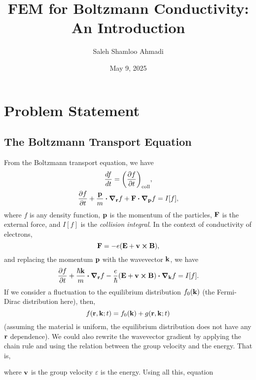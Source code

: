 \documentclass[12pt]{article}
\title{FEM for Boltzmann Conductivity: An Introduction}
\author{Saleh Shamloo Ahmadi}
\date{May 9, 2025}
\begin{document}
\maketitle
\section{Problem Statement}
\subsection{The Boltzmann Transport Equation}
From the Boltzmann transport equation, we have
\begin{gather}
    \dv{f}{t} = \qty(\pdv{f}{t})_{\text{coll}}, \\
    \pdv{f}{t} + \frac{\vb{p}}{m}\vdot\grad_{\vb{r}} f + \vb{F}\vdot\grad_{\vb{p}}f = I[f],
\end{gather}
where $f$ is any density function, $\vb{p}$ is the momentum of the particles, $\vb{F}$ is the
external force, and $I[f]$ is the \emph{collision integral}. In the context of conductivity of
electrons,
\begin{equation}
    \vb{F} = -e\qty(\vb{E} + \vb{v}\cross\vb{B}),
\end{equation}
and replacing the momentum $\vb{p}$ with the wavevector $\vb{k}$, we have
\begin{equation}
    \pdv{f}{t} + \frac{\hbar\vb{k}}{m}\vdot\grad_{\vb{r}} f
    - \frac{e}{\hbar}\qty(\vb{E} + \vb{v}\cross\vb{B})\vdot\grad_{\vb{k}}f = I[f].
    \label{eq:boltzmann_general}
\end{equation}
If we consider a fluctuation to the equilibrium distribution $f_0(\vb{k})$ (the Fermi-Dirac
distribution here), then,
\begin{equation}
    f(\vb{r}, \vb{k}; t) = f_0(\vb{k}) + g(\vb{r}, \vb{k}; t)
\end{equation}
(assuming the material is uniform, the equilibrium distribution does not have any $\vb{r}$
dependence). We could also rewrite the wavevector gradient by applying the chain rule and using
the relation between the group velocity and the energy. That is,
where $\vb{v}$ is the group velocity $\varepsilon$ is the energy. Using all this, equation
\end{document}
